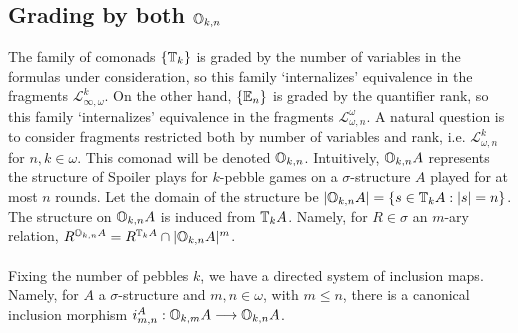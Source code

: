 \subsection{Grading by both ${\mathbb{O}_{k,n}}$}\label{sec:grading}
The family of comonads $\{{\mathbb{T}_{k}}\}$ is graded by the number of variables in the formulas under consideration, so this family `internalizes' equivalence in the fragments $\mathcal{L}^{k}_{\infty,\omega}$. On the other hand, $\{{\mathbb{E}_{n}}\}$ is graded by the quantifier rank, so this family `internalizes' equivalence in the fragments $\mathcal{L}^{\omega}_{\omega,n}$. A natural question is to consider fragments restricted both by number of variables and rank, i.e. $\mathcal{L}^{k}_{\omega,n}$ for $n,k \in \omega$. This comonad will be denoted ${\mathbb{O}_{k,n}}$. Intuitively, ${\mathbb{O}_{k,n}A}$ represents the structure of Spoiler plays for $k$-pebble games on a $\sigma$-structure $A$ played for at most $n$ rounds. Let the domain of the structure be $|{\mathbb{O}_{k,n}A}| = \{s \in {\mathbb{T}_{k}A}: |s| = n\}$. The structure on ${\mathbb{O}_{k,n}A}$ is induced from ${\mathbb{T}_{k}A}$. Namely, for $R \in \sigma$ an $m$-ary relation, $R^{{\mathbb{O}_{k,n}A}} = R^{{\mathbb{T}_{k}A}} \cap |{\mathbb{O}_{k,n}A}|^{m}$. 
\\~\\
Fixing the number of pebbles $k$, we have a directed system of inclusion maps. Namely, for $A$ a $\sigma$-structure and $m,n \in \omega$, with $m \leq n$, there is a canonical inclusion morphism $i_{m,n}^{A}:{\mathbb{O}_{k,m}A} \longrightarrow {\mathbb{O}_{k,n}A}$. \\
